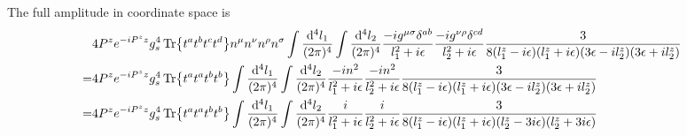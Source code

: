 \documentclass{article}
\newcommand{\mm}[1]{\frac{\dd^4#1}{(2\pi)^4}}
\begin{document}
The full amplitude in coordinate space is
\begin{align}
	&\begin{aligned}[t]
		&4P^ze^{-iP^zz}g_s^4\Tr{t^at^bt^ct^d}n^{\mu}n^{\nu}n^{\rho}n^{\sigma}\int\mm{l_1}\int\mm{l_2}\frac{-ig^{\mu\sigma}\delta^{ab}}{l_1^2+i\epsilon}\frac{-ig^{\nu\rho}\delta^{cd}}{l_2^2+i\epsilon}\frac{3}{8 ({l_1^z}-i \epsilon ) ({l_1^z}+i \epsilon ) (3 \epsilon -i {l_2^z}) (3 \epsilon +i {l_2^z})}
	\end{aligned}\\
	=&\begin{aligned}[t]
		&4P^ze^{-iP^zz}g_s^4\Tr{t^at^at^bt^b}\int\mm{l_1}\int\mm{l_2}\frac{-in^2}{l_1^2+i\epsilon}\frac{-in^2}{l_2^2+i\epsilon}\frac{3}{8 ({l_1^z}-i \epsilon ) ({l_1^z}+i \epsilon ) (3 \epsilon -i {l_2^z}) (3 \epsilon +i {l_2^z})}
	\end{aligned}\\
	=&\begin{aligned}[t]
		&4P^ze^{-iP^zz}g_s^4\Tr{t^at^at^bt^b}\int\mm{l_1}\int\mm{l_2}\frac{i}{l_1^2+i\epsilon}\frac{i}{l_2^2+i\epsilon}\frac{3}{8 ({l_1^z}-i \epsilon ) ({l_1^z}+i \epsilon ) ( {l_2^z}-3i \epsilon ) ( {l_2^z}+3i \epsilon )}
	\end{aligned}
\end{align}
\end{document}

